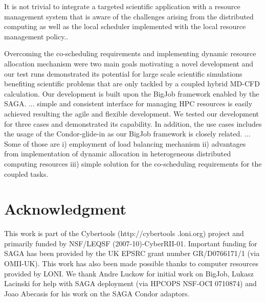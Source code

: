 \documentclass[conference,final]{IEEEtran}
\begin{document}
It is not trivial to integrate a targeted scientific application with
a resource management system that is aware of the challenges arising
from the distributed computing as well as the local scheduler
implemented with the local resource management policy..

Overcoming the co-scheduling requirements and implementing dynamic
resource allocation mechanism were two main goals motivating a novel
development and our test runs demonstrated its potential for large
scale scientific simulations benefiting scientific problems that are
only tackled by a coupled hybrid MD-CFD calculation.  Our development
is built upon the BigJob framework enabled by the SAGA. ... simple and
consistent interface for managing HPC resources is easily achieved
resulting the agile and flexible development. We tested our
development for three cases and demonstrated its capability. In
addition, the use cases includes the usage of the Condor-glide-in as
our BigJob framework is closely related. ... Some of those are i)
employment of load balancing mechanism ii) advantages from
implementation of dynamic allocation in heterogeneous distributed
computing resources iii) simple solution for the co-scheduling
requirements for the coupled tasks.

\section*{Acknowledgment}
This work is part of the Cybertools (http://cybertools .loni.org)
project and primarily funded by NSF/LEQSF (2007-10)-CyberRII-01.
Important funding for SAGA has been provided by the UK EPSRC grant
number GR/D0766171/1 (via OMII-UK). This work has also been made
possible thanks to computer resources provided by LONI. We thank Andre
Luckow for initial work on BigJob, Lukasz Lacinski for help with SAGA
deployment (via HPCOPS NSF-OCI 0710874) and Joao Abecasis for his work
on the SAGA Condor adaptors.

\nocite{ex1,ex2}
%


\end{document}
